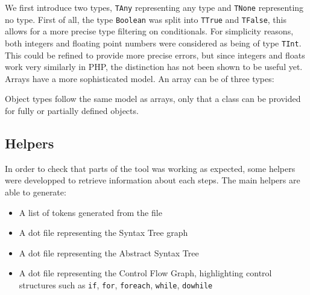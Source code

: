 \documentclass[a4paper]{article}
\begin{document}
We first introduce two types, \verb=TAny= representing any type and
\verb=TNone= representing no type. First of all, the type \verb=Boolean= was
split into \verb=TTrue= and \verb=TFalse=, this allows for a more precise type
filtering on conditionals.  For simplicity reasons, both integers and floating
point numbers were considered as being of type \verb=TInt=. This could be
refined to provide more precise errors, but since integers and floats work very
similarly in PHP, the distinction has not been shown to be useful yet. Arrays
have a more sophisticated model. An array can be of three types:

Object types follow the same model as arrays, only that a class can be provided
for fully or partially defined objects.

\subsection{Helpers}
In order to check that parts of the tool was working as expected, some helpers were
developped to retrieve information about each steps. The main helpers are able to generate:
\begin{itemize}
  \item A list of tokens generated from the file
  \item A dot file representing the Syntax Tree graph
  \item A dot file representing the Abstract Syntax Tree
  \item A dot file representing the Control Flow Graph, highlighting control structures
    such as \verb=if=, \verb=for=, \verb=foreach=, \verb=while=, \verb=dowhile=
\end{itemize}
\end{document}
